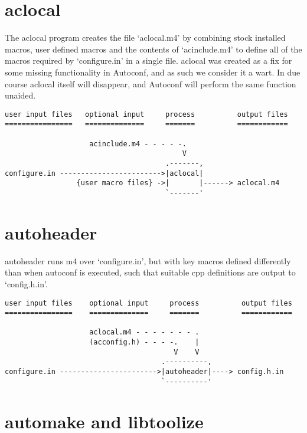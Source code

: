\section{aclocal}

The aclocal program creates the file `aclocal.m4' by combining stock installed macros, user defined macros and the contents of `acinclude.m4' to define all of the macros required by `configure.in' in a single file. aclocal was created as a fix for some missing functionality in Autoconf, and as such we consider it a wart. In due course aclocal itself will disappear, and Autoconf will perform the same function unaided.

 	
\begin{verbatim}
user input files   optional input     process          output files
================   ==============     =======          ============

                    acinclude.m4 - - - - -.
                                          V
                                      .-------,
configure.in ------------------------>|aclocal|
                 {user macro files} ->|       |------> aclocal.m4
                                      `-------'

\end{verbatim}

\section{autoheader}

autoheader runs m4 over `configure.in', but with key macros defined differently than when autoconf is executed, such that suitable cpp definitions are output to `config.h.in'.

\newpage 	

\begin{verbatim}
user input files    optional input     process          output files
================    ==============     =======          ============

                    aclocal.m4 - - - - - - - .
                    (acconfig.h) - - - -.    |
                                        V    V
                                     .----------,
configure.in ----------------------->|autoheader|----> config.h.in
                                     `----------'
\end{verbatim}


\section{automake and libtoolize}

